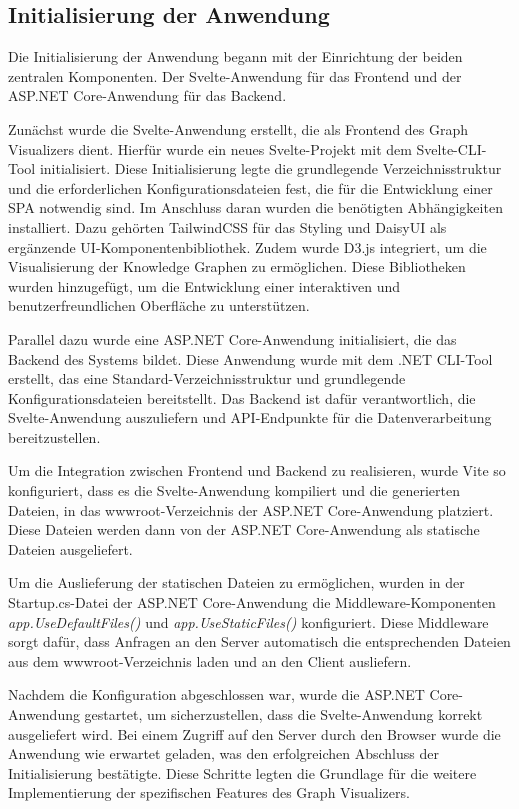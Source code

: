 \subsection{Initialisierung der Anwendung}

Die Initialisierung der Anwendung begann mit der Einrichtung der beiden zentralen Komponenten. Der Svelte-Anwendung für das Frontend und der ASP.NET Core-Anwendung für das Backend.

Zunächst wurde die Svelte-Anwendung erstellt, die als Frontend des Graph Visualizers dient. Hierfür wurde ein neues Svelte-Projekt mit dem Svelte-CLI-Tool initialisiert. Diese Initialisierung legte die grundlegende Verzeichnisstruktur und die erforderlichen Konfigurationsdateien fest, die für die Entwicklung einer \ac{SPA} notwendig sind. Im Anschluss daran wurden die benötigten Abhängigkeiten installiert. Dazu gehörten TailwindCSS für das Styling und DaisyUI als ergänzende UI-Komponentenbibliothek. Zudem wurde D3.js integriert, um die Visualisierung der Knowledge Graphen zu ermöglichen. Diese Bibliotheken wurden hinzugefügt, um die Entwicklung einer interaktiven und benutzerfreundlichen Oberfläche zu unterstützen.

Parallel dazu wurde eine ASP.NET Core-Anwendung initialisiert, die das Backend des Systems bildet. Diese Anwendung wurde mit dem .NET CLI-Tool erstellt, das eine Standard-Verzeichnisstruktur und grundlegende Konfigurationsdateien bereitstellt. Das Backend ist dafür verantwortlich, die Svelte-Anwendung auszuliefern und API-Endpunkte für die Datenverarbeitung bereitzustellen.

Um die Integration zwischen Frontend und Backend zu realisieren, wurde Vite so konfiguriert, dass es die Svelte-Anwendung kompiliert und die generierten Dateien, in das wwwroot-Verzeichnis der ASP.NET Core-Anwendung platziert. Diese Dateien werden dann von der ASP.NET Core-Anwendung als statische Dateien ausgeliefert.

Um die Auslieferung der statischen Dateien zu ermöglichen, wurden in der Startup.cs-Datei der ASP.NET Core-Anwendung die Middleware-Komponenten \textit{app.UseDefaultFiles()} und \textit{app.UseStaticFiles()} konfiguriert. Diese Middleware sorgt dafür, dass Anfragen an den Server automatisch die entsprechenden Dateien aus dem wwwroot-Verzeichnis laden und an den Client ausliefern.

Nachdem die Konfiguration abgeschlossen war, wurde die ASP.NET Core-Anwendung gestartet, um sicherzustellen, dass die Svelte-Anwendung korrekt ausgeliefert wird. Bei einem Zugriff auf den Server durch den Browser wurde die Anwendung wie erwartet geladen, was den erfolgreichen Abschluss der Initialisierung bestätigte. Diese Schritte legten die Grundlage für die weitere Implementierung der spezifischen Features des Graph Visualizers.

